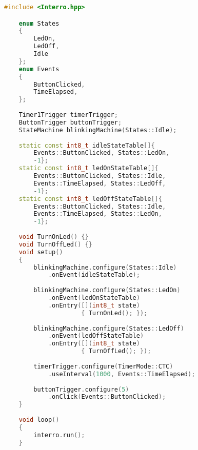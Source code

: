 \begin{lstlisting}[language=c++]      
    #include <Interro.hpp>

    enum States
    {
        LedOn,
        LedOff,
        Idle
    };
    enum Events
    {
        ButtonClicked,
        TimeElapsed,
    };
    
    Timer1Trigger timerTrigger;
    ButtonTrigger buttonTrigger;
    StateMachine blinkingMachine(States::Idle);
    
    static const int8_t idleStateTable[]{
        Events::ButtonClicked, States::LedOn,
        -1};    
    static const int8_t ledOnStateTable[]{
        Events::ButtonClicked, States::Idle,
        Events::TimeElapsed, States::LedOff,
        -1};
    static const int8_t ledOffStateTable[]{
        Events::ButtonClicked, States::Idle,
        Events::TimeElapsed, States::LedOn,
        -1};
    
    void TurnOnLed() {}  
    void TurnOffLed() {}     
    void setup()
    {
        blinkingMachine.configure(States::Idle)
            .onEvent(idleStateTable);
    
        blinkingMachine.configure(States::LedOn)
            .onEvent(ledOnStateTable)
            .onEntry([](int8_t state)
                     { TurnOnLed(); });
    
        blinkingMachine.configure(States::LedOff)
            .onEvent(ledOffStateTable)
            .onEntry([](int8_t state)
                     { TurnOffLed(); });
    
        timerTrigger.configure(TimerMode::CTC)
            .useInterval(1000, Events::TimeElapsed); 
    
        buttonTrigger.configure(5)
            .onClick(Events::ButtonClicked);
    }
    
    void loop()
    {
        interro.run();
    }
\end{lstlisting}
